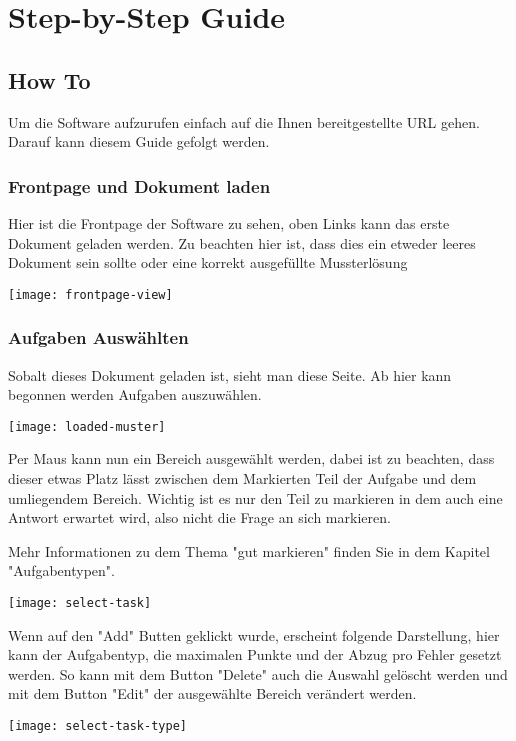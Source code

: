 \author{Tadd\"aus Nauheimer}
\chapter{Step-by-Step Guide}

\section{How To}
Um die Software aufzurufen einfach auf die Ihnen bereitgestellte URL gehen.
Darauf kann diesem Guide gefolgt werden.

\subsection{Frontpage und Dokument laden}

Hier ist die Frontpage der Software zu sehen, oben Links kann das erste Dokument geladen werden.
Zu beachten hier ist, dass dies ein etweder leeres Dokument sein sollte oder eine korrekt ausgef\"ullte Mussterl\"osung

\texttt{[image: frontpage-view]}

\subsection{Aufgaben Ausw\"ahlten}

Sobalt dieses Dokument geladen ist, sieht man diese Seite. 
Ab hier kann begonnen werden Aufgaben auszuw\"ahlen.

\texttt{[image: loaded-muster]}

Per Maus kann nun ein Bereich ausgew\"ahlt werden, dabei ist zu beachten, dass dieser etwas Platz l\"asst zwischen dem Markierten Teil der Aufgabe und dem umliegendem Bereich.
Wichtig ist es nur den Teil zu markieren in dem auch eine Antwort erwartet wird, also nicht die Frage an sich markieren.

Mehr Informationen zu dem Thema "gut markieren" finden Sie in dem Kapitel "Aufgabentypen".

\texttt{[image: select-task]}

Wenn auf den "Add" Butten geklickt wurde, erscheint folgende Darstellung, hier kann der Aufgabentyp, die maximalen Punkte und der Abzug pro Fehler gesetzt werden.
So kann mit dem Button "Delete" auch die Auswahl gel\"oscht werden und mit dem Button "Edit" der ausgew\"ahlte Bereich ver\"andert werden.

\texttt{[image: select-task-type]}

